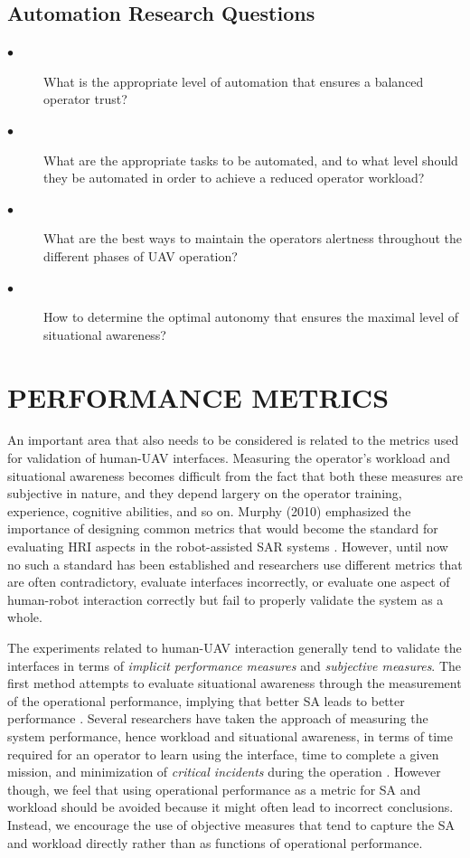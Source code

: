 \documentclass[12pt, letterpaper, oneside]{article}
\begin{document}
\subsection{Automation Research Questions}

\begin{description}
	\item[$\bullet$] 
	What is the appropriate level of automation that ensures a balanced operator trust? 
	\item[$\bullet$] 
	What are the appropriate tasks to be automated, and to what level should they be automated in order to achieve a reduced operator workload?
	\item[$\bullet$] 
	What are the best ways to maintain the operators alertness throughout the different phases of UAV operation? 
	\item[$\bullet$]
	How to determine the optimal autonomy that ensures the maximal level of situational awareness? 
\end{description}

\section{PERFORMANCE METRICS}
An important area that also needs to be considered is related to the metrics used for validation of human-UAV interfaces. Measuring the operator's workload and situational awareness becomes difficult from the fact that both these measures are subjective in nature, and they depend largery on the operator training, experience, cognitive abilities, and so on. Murphy (2010) emphasized the importance of designing common metrics that would become the standard for evaluating HRI aspects in the robot-assisted SAR systems \cite{28}. However, until now no such a standard has been established and researchers use different metrics that are often contradictory, evaluate interfaces incorrectly, or evaluate one aspect of human-robot interaction correctly but fail to properly validate the system as a whole. 

The experiments related to human-UAV interaction generally tend to validate the interfaces in terms of \emph{implicit performance measures} and \emph{subjective measures}. The first method attempts to evaluate situational awareness through the measurement of the operational performance, implying that better SA leads to better performance \cite{12}. Several researchers have taken the approach of measuring the system performance, hence workload and situational awareness, in terms of time required for an operator to learn using the interface, time to complete a given mission, and minimization of \emph{critical incidents} during the operation \cite{18}. However though, we feel that using operational performance as a metric for SA and workload should be avoided because it might often lead to incorrect conclusions. Instead, we encourage the use of objective measures that tend to capture the SA and workload directly rather than as functions of operational performance. 
\end{document}
